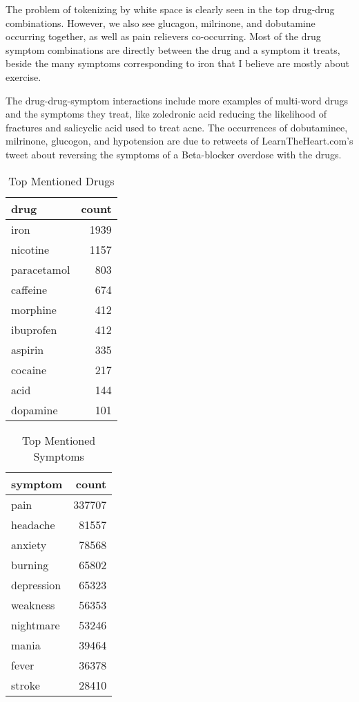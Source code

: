 \documentclass[letterpaper]{article}
\begin{document}
The problem of tokenizing by white space is clearly seen in the top drug-drug combinations. However, we also see glucagon, milrinone, and dobutamine occurring together, as well as pain relievers co-occurring. Most of the drug symptom combinations are directly between the drug and a symptom it treats, beside the many symptoms corresponding to iron that I believe are mostly about exercise. 

The drug-drug-symptom interactions include more examples of multi-word drugs and the symptoms they treat, like zoledronic acid reducing the likelihood of fractures and salicyclic acid used to treat acne. The occurrences of dobutaminee, milrinone, glucogon, and hypotension are due to retweets of LearnTheHeart.com's tweet about reversing the symptoms of a Beta-blocker overdose with the drugs.

\begin{table}
\begin{tabular}{lr}
\hline
drug & count \\
\hline
iron & 1939\\
nicotine & 1157\\
paracetamol & 803\\
caffeine & 674\\
morphine & 412\\
ibuprofen & 412\\
aspirin & 335\\
cocaine & 217\\
acid & 144\\
dopamine & 101\\
\hline
\end{tabular}
\label{TabDrugCount}
\caption{Top Mentioned Drugs}
\end{table}

\begin{table}
\begin{tabular}{lr}
\hline
symptom & count \\
\hline
pain & 337707\\
headache & 81557\\
anxiety & 78568\\
burning & 65802\\
depression & 65323\\
weakness & 56353\\
nightmare & 53246\\
mania & 39464\\
fever & 36378\\
stroke & 28410\\
\hline
\end{tabular}
\label{TabSymptomCount}
\caption{Top Mentioned Symptoms}
\end{table}
\end{document}
